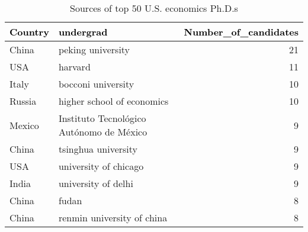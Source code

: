\begin{table}[H]

\caption{Sources of top 50 U.S. economics Ph.D.s}
\centering
\fontsize{8}{10}\selectfont
\begin{tabular}[t]{l|l|r}
\hline
\textcolor{black}{\textbf{Country}} & \textcolor{black}{\textbf{undergrad}} & \textcolor{black}{\textbf{Number\_of\_candidates}}\\
\hline
China & peking university & 21\\
\hline
USA & harvard & 11\\
\hline
Italy & bocconi university & 10\\
\hline
Russia & higher school of economics & 10\\
\hline
Mexico & Instituto Tecnológico Autónomo de México & 9\\
\hline
China & tsinghua university & 9\\
\hline
USA & university of chicago & 9\\
\hline
India & university of delhi & 9\\
\hline
China & fudan & 8\\
\hline
China & renmin university of china & 8\\
\hline
\end{tabular}
\end{table}
